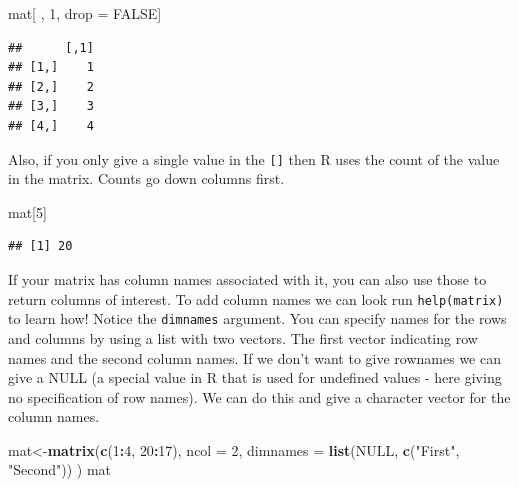 \documentclass[
]{book}
\newenvironment{Shaded}{\begin{snugshade}}{\end{snugshade}}
\newcommand{\DataTypeTok}[1]{\textcolor[rgb]{0.13,0.29,0.53}{#1}}
\newcommand{\DecValTok}[1]{\textcolor[rgb]{0.00,0.00,0.81}{#1}}
\newcommand{\KeywordTok}[1]{\textcolor[rgb]{0.13,0.29,0.53}{\textbf{#1}}}
\newcommand{\NormalTok}[1]{#1}
\newcommand{\OperatorTok}[1]{\textcolor[rgb]{0.81,0.36,0.00}{\textbf{#1}}}
\newcommand{\OtherTok}[1]{\textcolor[rgb]{0.56,0.35,0.01}{#1}}
\newcommand{\StringTok}[1]{\textcolor[rgb]{0.31,0.60,0.02}{#1}}
\theoremstyle{definition}
\theoremstyle{definition}
\theoremstyle{definition}
\theoremstyle{remark}
\begin{document}
\begin{Shaded}
\begin{Highlighting}[]
\NormalTok{mat[ , }\DecValTok{1}\NormalTok{, drop =}\StringTok{ }\OtherTok{FALSE}\NormalTok{]}
\end{Highlighting}
\end{Shaded}

\begin{verbatim}
##      [,1]
## [1,]    1
## [2,]    2
## [3,]    3
## [4,]    4
\end{verbatim}

Also, if you only give a single value in the \texttt{{[}{]}} then R uses the count of the value in the matrix. Counts go down columns first.

\begin{Shaded}
\begin{Highlighting}[]
\NormalTok{mat[}\DecValTok{5}\NormalTok{]}
\end{Highlighting}
\end{Shaded}

\begin{verbatim}
## [1] 20
\end{verbatim}

If your matrix has column names associated with it, you can also use those to return columns of interest. To add column names we can look run \texttt{help(matrix)} to learn how! Notice the \texttt{dimnames} argument. You can specify names for the rows and columns by using a list with two vectors. The first vector indicating row names and the second column names. If we don't want to give rownames we can give a NULL (a special value in R that is used for undefined values - here giving no specification of row names). We can do this and give a character vector for the column names.

\begin{Shaded}
\begin{Highlighting}[]
\NormalTok{mat<-}\KeywordTok{matrix}\NormalTok{(}\KeywordTok{c}\NormalTok{(}\DecValTok{1}\OperatorTok{:}\DecValTok{4}\NormalTok{, }\DecValTok{20}\OperatorTok{:}\DecValTok{17}\NormalTok{), }\DataTypeTok{ncol =} \DecValTok{2}\NormalTok{,}
            \DataTypeTok{dimnames =} \KeywordTok{list}\NormalTok{(}\OtherTok{NULL}\NormalTok{, }\KeywordTok{c}\NormalTok{(}\StringTok{"First"}\NormalTok{, }\StringTok{"Second"}\NormalTok{))}
\NormalTok{            )}
\NormalTok{mat}
\end{Highlighting}
\end{Shaded}
\end{document}
